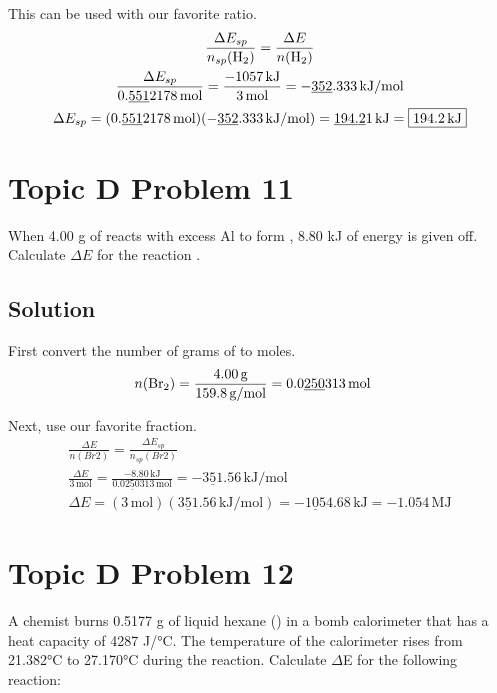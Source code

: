 \documentclass[10pt]{article}
\newcommand{\U}[1]{\underline{#1}}
\begin{document}
            This can be used with our favorite ratio.
            \begin{gather}
                \frac{\Delta E_{sp}}{n_{sp}(\ce{H2})}  =   \frac{\Delta E}{n(\ce{H2})}\\
                \frac{\Delta E_{sp}}{0.\U{551}2178\,\unit{\mole}}  =   \frac{-1057\,\unit{\kilo\joule}}{3\,\unit{\mole}}
                    =   -\U{352}.333\,\unit{\kilo\joule/\mole}\\
                \Delta E_{sp}   =   (0.\U{551}2178\,\unit{\mole}) (-\U{352}.333\,\unit{\kilo\joule/\mole})
                    =   \U{194.2}1\,\unit{\kilo\joule}
                    =   \boxed{194.2\,\unit{\kilo\joule}}
            \end{gather}

    \pagebreak
    \section{Topic D Problem 11}
        When 4.00 g of  reacts with excess Al to form , 8.80 kJ of energy is given off.
        Calculate $\Delta E$ for the reaction .
        
        \subsection{Solution}
            First convert the number of grams of  to moles. 
            \begin{align}
                n(\ce{Br2}) &=  \frac{4.00\,\unit{\gram}}{159.8\,\unit{\gram/\mole}}
                    =   0.0\U{250}313\,\unit{\mole}
            \end{align}

            Next, use our favorite fraction.
            \begin{gather}
                \frac{\Delta E}{n(Br2)} =   \frac{\Delta E_{sp}}{n_{sp}(Br2)}\\
                \frac{\Delta E}{3\,\unit{\mole}}    =   \frac{-8.80\,\unit{\kilo\joule}}{0.0\U{250}313\,\unit{\mole}}
                    =   -\U{351}.56\,\unit{\kilo\joule/\mole}\\
                \Delta E    =   (3\,\unit{\mole}) (\U{351}.56\,\unit{\kilo\joule/\mole})
                    =   -\U{105}4.68\,\unit{\kilo\joule}
                    =   \boxed{-1.054\,\unit{\mega\joule}}
            \end{gather}

    \pagebreak
    \section{Topic D Problem 12}
        A chemist burns 0.5177 g of liquid hexane () in a bomb calorimeter that has a heat capacity of 4287 J/\unit{\celsius}. 
        The temperature of the calorimeter rises from 21.382\unit{\celsius} to 27.170\unit{\celsius} during the reaction. 
        Calculate $\Delta$E for the following reaction: 
        \begin{center}
        \end{center}
        
\end{document}
